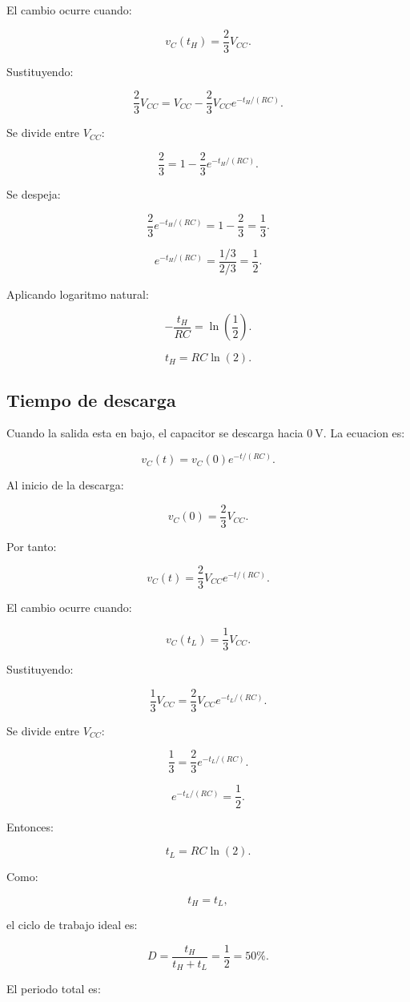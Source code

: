 \documentclass[11pt,letterpaper]{article}
\begin{document}
El cambio ocurre cuando:

\[
v_C(t_H)=\frac{2}{3}V_{CC}.
\]

Sustituyendo:

\[
\frac{2}{3}V_{CC}
=
V_{CC}-\frac{2}{3}V_{CC}e^{-t_H/(RC)}.
\]

Se divide entre \(V_{CC}\):

\[
\frac{2}{3}
=
1-\frac{2}{3}e^{-t_H/(RC)}.
\]

Se despeja:

\[
\frac{2}{3}e^{-t_H/(RC)}
=
1-\frac{2}{3}
=
\frac{1}{3}.
\]

\[
e^{-t_H/(RC)}
=
\frac{1/3}{2/3}
=
\frac{1}{2}.
\]

Aplicando logaritmo natural:

\[
-\frac{t_H}{RC}=\ln\left(\frac{1}{2}\right).
\]

\[
t_H=RC\ln(2).
\]

\subsection{Tiempo de descarga}

Cuando la salida esta en bajo, el capacitor se descarga hacia \(0~\text{V}\).
La ecuacion es:

\[
v_C(t)=v_C(0)e^{-t/(RC)}.
\]

Al inicio de la descarga:

\[
v_C(0)=\frac{2}{3}V_{CC}.
\]

Por tanto:

\[
v_C(t)=\frac{2}{3}V_{CC}e^{-t/(RC)}.
\]

El cambio ocurre cuando:

\[
v_C(t_L)=\frac{1}{3}V_{CC}.
\]

Sustituyendo:

\[
\frac{1}{3}V_{CC}
=
\frac{2}{3}V_{CC}e^{-t_L/(RC)}.
\]

Se divide entre \(V_{CC}\):

\[
\frac{1}{3}
=
\frac{2}{3}e^{-t_L/(RC)}.
\]

\[
e^{-t_L/(RC)}
=
\frac{1}{2}.
\]

Entonces:

\[
t_L=RC\ln(2).
\]

Como:

\[
t_H=t_L,
\]

el ciclo de trabajo ideal es:

\[
D=\frac{t_H}{t_H+t_L}
=
\frac{1}{2}
=50\%.
\]

El periodo total es:
\end{document}
